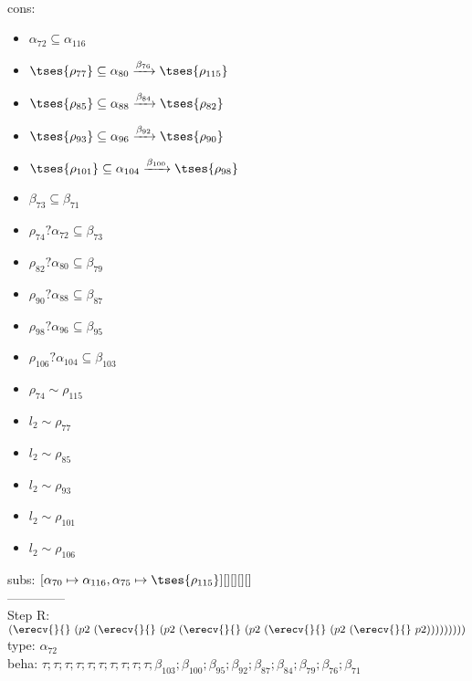 \documentclass[12pt]{article}
\begin{document}
 \\ cons: \begin{itemize}
\item $ \alpha_{72} \subseteq \alpha_{116} $
\item $  \tses{ \rho_{77}} \subseteq \alpha_{80} \xrightarrow{\beta_{76}}  \tses{ \rho_{115}} $
\item $  \tses{ \rho_{85}} \subseteq \alpha_{88} \xrightarrow{\beta_{84}}  \tses{ \rho_{82}} $
\item $  \tses{ \rho_{93}} \subseteq \alpha_{96} \xrightarrow{\beta_{92}}  \tses{ \rho_{90}} $
\item $  \tses{ \rho_{101}} \subseteq \alpha_{104} \xrightarrow{\beta_{100}}  \tses{ \rho_{98}} $
\item $ \beta_{73} \subseteq \beta_{71} $
\item $ \rho_{74}?\alpha_{72} \subseteq \beta_{73} $
\item $ \rho_{82}?\alpha_{80} \subseteq \beta_{79} $
\item $ \rho_{90}?\alpha_{88} \subseteq \beta_{87} $
\item $ \rho_{98}?\alpha_{96} \subseteq \beta_{95} $
\item $ \rho_{106}?\alpha_{104} \subseteq \beta_{103} $
\item $ \rho_{74} \sim\rho_{115} $
\item $ l_{2} \sim\rho_{77} $
\item $ l_{2} \sim\rho_{85} $
\item $ l_{2} \sim\rho_{93} $
\item $ l_{2} \sim\rho_{101} $
\item $ l_{2} \sim\rho_{106} $
\end{itemize}
 subs:  $ [ \alpha_{70}\mapsto\alpha_{116}, \alpha_{75}\mapsto \tses{ \rho_{115}}] [] [] [] [] $ 
  \\--------------\\ 
Step R: $ (\erecv{}{}~(p2~(\erecv{}{}~(p2~(\erecv{}{}~(p2~(\erecv{}{}~(p2~(\erecv{}{}~p2))))))))) $\\
  type: $ \alpha_{72} $ 
\\  beha: $ \tau; \tau; \tau; \tau; \tau; \tau; \tau; \tau; \tau; \tau; \beta_{103}; \beta_{100}; \beta_{95}; \beta_{92}; \beta_{87}; \beta_{84}; \beta_{79}; \beta_{76}; \beta_{71} $ 
\end{document}
